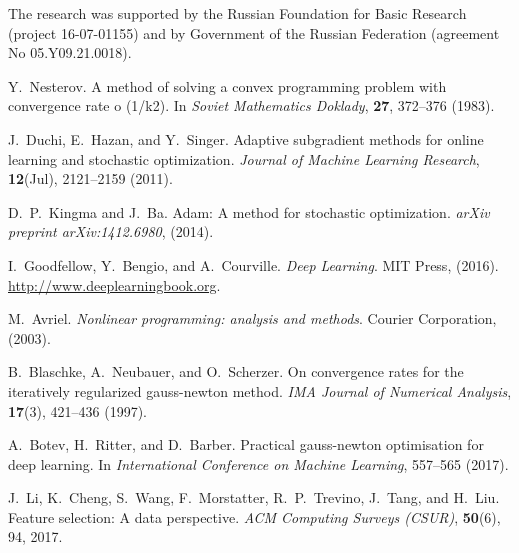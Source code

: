 \documentclass[
11pt,%
tightenlines,%
twoside,%
onecolumn,%
nofloats,%
nobibnotes,%
nofootinbib,%
superscriptaddress,%
noshowpacs,%
centertags]%
{revtex4}
\begin{document}
\begin{acknowledgments}

The research was supported by the Russian Foundation for Basic Research (project 16-07-01155) and by Government of the Russian Federation (agreement No 05.Y09.21.0018).

\end{acknowledgments}


\begin{thebibliography}{10}
	
	Y.~Nesterov. A method of solving a convex programming problem with convergence
	rate o (1/k2). 
	In {\em Soviet Mathematics Doklady}, \textbf{27}, 372--376 (1983).
	
	J.~Duchi, E.~Hazan, and Y.~Singer.
	Adaptive subgradient methods for online learning and stochastic
	optimization.
	{\em Journal of Machine Learning Research}, \textbf{12}(Jul), 2121--2159 (2011).
	
	D.~P.~Kingma and J.~Ba.
	Adam: A method for stochastic optimization.
	{\em arXiv preprint arXiv:1412.6980}, (2014).
	
	I.~Goodfellow, Y.~Bengio, and A.~Courville.
	{\em Deep Learning}.
	MIT Press, (2016).
	\url{http://www.deeplearningbook.org}.
	
	M.~Avriel.
	{\em Nonlinear programming: analysis and methods}.
	Courier Corporation, (2003).
	
	B.~Blaschke, A.~Neubauer, and O.~Scherzer.
	On convergence rates for the iteratively regularized gauss-newton
	method.
	{\em IMA Journal of Numerical Analysis}, \textbf{17}(3), 421--436 (1997).
	
	A.~Botev, H.~Ritter, and D.~Barber.
	Practical gauss-newton optimisation for deep learning.
	In {\em International Conference on Machine Learning},
	557--565 (2017).
	
	J.~Li, K.~Cheng, S.~Wang, F.~Morstatter, R.~P.~Trevino,
	J.~Tang, and H.~Liu.
	Feature selection: A data perspective.
	{\em ACM Computing Surveys (CSUR)}, \textbf{50}(6), 94, 2017.
	

\end{thebibliography}
\end{document}
